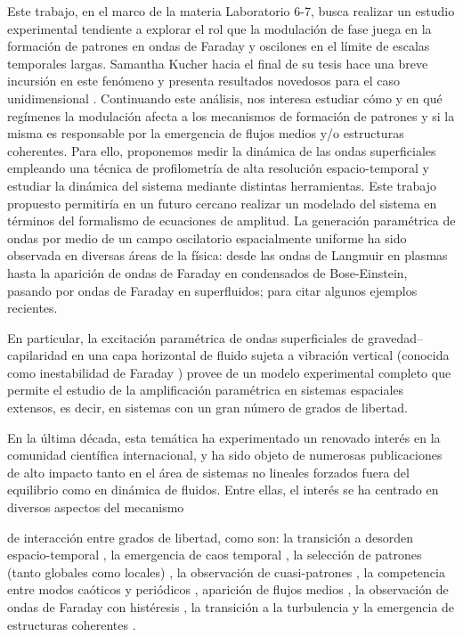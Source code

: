 \documentclass[../main.tex]{subfiles}
\begin{document}
Este trabajo, en el marco de la materia Laboratorio 6-7, busca realizar un estudio experimental tendiente a explorar el rol que la modulación de fase juega en la formación de patrones en ondas de Faraday y oscilones en el límite de escalas temporales largas. Samantha Kucher hacia el final de su tesis hace una breve incursión en este fenómeno y presenta resultados novedosos para el caso unidimensional \cite{kucher_modulacion_2019}. Continuando este análisis, nos interesa estudiar cómo y en qué regímenes la modulación afecta a los mecanismos de formación de patrones y si la misma es responsable por la emergencia de ﬂujos medios y/o estructuras coherentes. Para ello, proponemos medir la dinámica de las ondas superﬁciales empleando una técnica de proﬁlometría de alta resolución espacio-temporal y estudiar la dinámica del sistema mediante distintas herramientas. Este trabajo propuesto permitiría en un futuro cercano realizar un modelado del sistema en términos del formalismo de ecuaciones de amplitud.
La generación paramétrica de ondas por medio de un campo oscilatorio espacialmente uniforme ha sido observada en diversas áreas de la física: desde las ondas de Langmuir en plasmas hasta la aparición de ondas de Faraday en condensados de Bose-Einstein, pasando por ondas de Faraday en superﬂuidos; para citar algunos ejemplos recientes. 

En particular, la excitación paramétrica de ondas superﬁciales de gravedad–capilaridad en una capa horizontal de ﬂuido sujeta a vibración vertical (conocida como inestabilidad de Faraday \cite{faraday_peculiar_1831}) provee de un modelo experimental completo que permite el estudio de la ampliﬁcación paramétrica en sistemas espaciales extensos, es decir, en sistemas con un gran número de grados de libertad.

En la última década, esta temática ha experimentado un renovado interés en la comunidad cientíﬁca internacional, y ha sido objeto de numerosas publicaciones de alto impacto tanto en el área de sistemas no lineales forzados fuera del equilibrio como en dinámica de ﬂuidos. Entre ellas, el interés se ha centrado en diversos aspectos del mecanismo

de interacción entre grados de libertad, como son: la transición a desorden espacio-temporal \cite{wesfreid_propagation_1988}, la emergencia de caos temporal \cite{keolian_subharmonic_1981}, la selección de patrones (tanto globales como locales) \cite{binks_nonlinear_1997, chen_nonlinear_2002, kumar_competing_1995}, la observación de cuasi-patrones \cite{edwards_patterns_1994}, la competencia entre modos caóticos y periódicos \cite{ciliberto_chaotic_1985}, aparición de ﬂujos medios \cite{higuera_faraday_2008, perinet_streaming_2017}, la observación de ondas de Faraday con histéresis \cite{perinet_hysteretic_2016}, la transición a la turbulencia \cite{shani_localized_2010, shats_turbulence_2014} y la emergencia de estructuras coherentes \cite{francois_inverse_2013, francois_three-dimensional_2014}.
\end{document}
